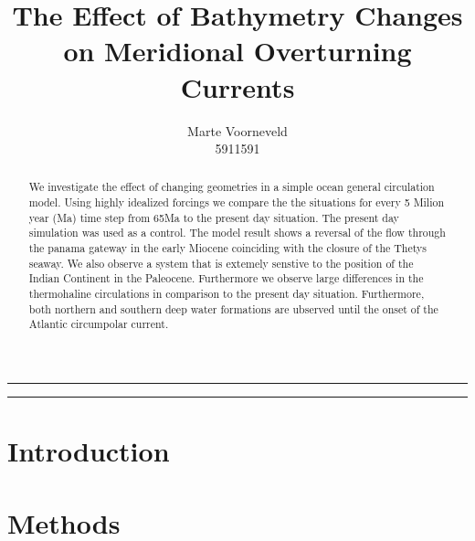 \documentclass[a4paper]{article}
\title{The Effect of Bathymetry Changes on Meridional Overturning Currents}
\author{Marte Voorneveld\\
		5911591}
\begin{document}
\maketitle
\noindent\rule{\textwidth}{1pt}
\begin{abstract}
We investigate the effect of changing geometries in a simple ocean general circulation model. Using highly idealized forcings we compare the the situations for every 5 Milion year (Ma) time step from 65Ma to the present day situation. The present day simulation was used as a control. The model result shows a reversal of the flow through the panama gateway in the early Miocene coinciding with the closure of the Thetys seaway. We also observe a system that is extemely senstive to the position of the Indian Continent in the Paleocene. Furthermore we observe large differences in the thermohaline circulations in comparison to the present day situation. Furthermore, both northern and southern deep water formations are ubserved until the onset of the Atlantic circumpolar current.
\end{abstract}
\noindent\rule{\textwidth}{1pt}
\begin{multicols}{2}
\section{Introduction}


\section{Methods}






\end{multicols}
\end{document}

